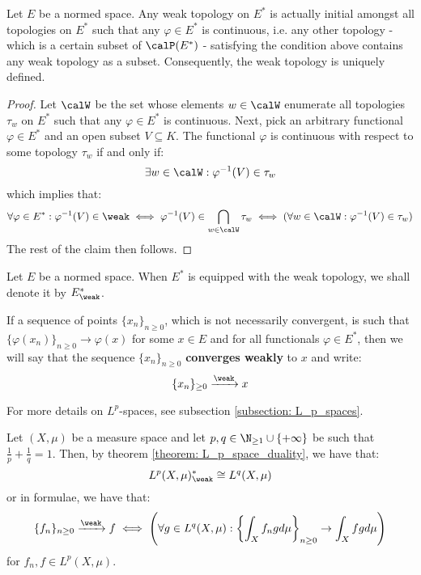         \begin{proposition}
            Let $E$ be a normed space. Any weak topology on $E^*$ is actually initial amongst all topologies on $E^*$ such that any $\varphi \in E^*$ is continuous, i.e. any other topology - which is a certain subset of $\calP(E^*)$ - satisfying the condition above contains any weak topology as a subset. Consequently, the weak topology is uniquely defined.
        \end{proposition}
            \begin{proof}
                Let $\calW$ be the set whose elements $w \in \calW$ enumerate all topologies $\tau_w$ on $E^*$ such that any $\varphi \in E^*$ is continuous. Next, pick an arbitrary functional $\varphi \in E^*$ and an open subset $V \subseteq K$. The functional $\varphi$ is continuous with respect to some topology $\tau_w$ if and only if:
                    $$\exists w \in \calW: \varphi^{-1}(V) \in \tau_w$$
                which implies that:
                    $$\forall \varphi \in E^*: \varphi^{-1}(V) \in \weak \iff \varphi^{-1}(V) \in \bigcap_{w \in \calW} \tau_w \iff ( \forall w \in \calW: \varphi^{-1}(V) \in \tau_w )$$
                The rest of the claim then follows.
            \end{proof}
        \begin{convention}
            Let $E$ be a normed space. When $E^*$ is equipped with the weak topology, we shall denote it by $E^*_{\weak}$. 
            
            If a sequence of points $\{x_n\}_{n \geq 0}$, which is not necessarily convergent, is such that $\{\varphi(x_n)\}_{n \geq 0} \to \varphi(x)$ for some $x \in E$ and for all functionals $\varphi \in E^*$, then we will say that the sequence $\{x_n\}_{n \geq 0}$ \textbf{converges weakly} to $x$ and write:
                $$\{x_n\}_{\geq 0} \xrightarrow[]{\weak} x$$
        \end{convention}
        \begin{example}[$L^p$-convergence]
            For more details on $L^p$-spaces, see subsection \ref{subsection: L_p_spaces}.

            Let $(X, \mu)$ be a measure space and let $p, q \in \N_{\geq 1} \cup \{+\infty\}$ be such that $\frac1p + \frac1q = 1$. Then, by theorem \ref{theorem: L_p_space_duality}, we have that:
                $$L^p(X, \mu)^*_{\weak} \cong L^q(X, \mu)$$
            or in formulae, we have that:
                $$\{f_n\}_{n \geq 0} \xrightarrow[]{\weak} f \iff \left( \forall g \in L^q(X, \mu): \left\{ \int_X f_n g d\mu \right\}_{n \geq 0} \to \int_X fg d\mu \right)$$
            for $f_n, f \in L^p(X, \mu)$.
        \end{example}
